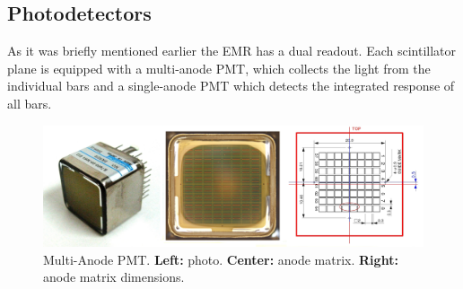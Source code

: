 \documentclass[a4paper,11pt]{article}
\begin{document}
\subsection{Photodetectors}
As it was briefly mentioned earlier the EMR has a dual readout. Each scintillator plane is equipped with a multi-anode PMT, which collects
the light from the individual bars and a single-anode PMT which detects the integrated response of all bars. 
\begin{figure}[h]
 \centering
 \includegraphics[width=\textwidth]{./mapmt}
 \caption[Multi-Anode PMT]{Multi-Anode PMT. {\bf Left:} photo. {\bf Center:} anode matrix. {\bf Right:} anode matrix dimensions.}
 \label{fig:mapmt}
\end{figure}
\end{document}
